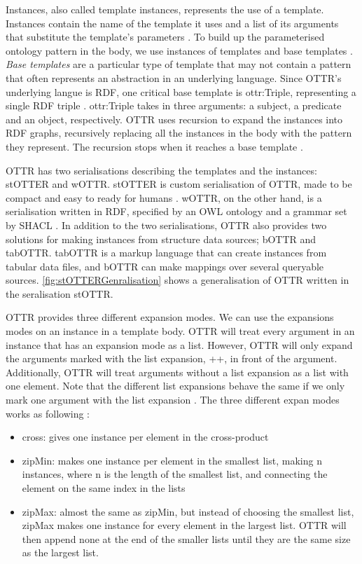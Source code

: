 \para
Instances, also called template instances, represents the use of a template.  Instances contain the name of the template it uses and a list of its arguments that substitute the template's parameters \autocite[3]{SLKK_OTTR_2021}. To build up the parameterised ontology pattern in the body, we use instances of templates and base templates \autocite[479]{SLKF_OTTR_2018}. \emph{Base templates} are a particular type of template that may not contain a pattern that often represents an abstraction in an underlying language. Since OTTR's underlying langue is RDF, one critical base template is ottr:Triple, representing a single RDF triple \autocite[4]{SLKK_OTTR_2021}. ottr:Triple takes in three arguments: a subject, a predicate and an object, respectively. OTTR uses recursion to expand the instances into RDF graphs, recursively replacing all the instances in the body with the pattern they represent. The recursion stops when it reaches a base template \autocite[479]{SLKF_OTTR_2018}.

\para
OTTR has two serialisations describing the templates and the instances: stOTTER and wOTTR. stOTTER is custom serialisation of OTTR, made to be compact and easy to ready for humans \autocite[4]{SLKK_OTTR_2021}. wOTTR, on the other hand, is a serialisation written in RDF, specified by an OWL ontology and a grammar set by SHACL \autocite{SHACL} \autocite[4]{SLKK_OTTR_2021}. In addition to the two serialisations, OTTR also provides two solutions for making instances from structure data sources; bOTTR and tabOTTR. tabOTTR is a markup language that can create instances from tabular data files, and bOTTR can make mappings over several queryable sources\autocite[16]{SLKK_OTTR_2021}. \autoref{fig:stOTTERGenralisation} shows a generalisation of OTTR written in the seralisation stOTTR.

\para
OTTR provides three different expansion modes. We can use the expansions modes on an instance in a template body. OTTR will treat every argument in an instance that has an expansion mode as a list. However, OTTR will only expand the arguments marked with the list expansion, ++, in front of the argument. Additionally, OTTR will treat arguments without a list expansion as a list with one element. Note that the different list expansions behave the same if we only mark one argument with the list expansion \autocite[480]{SLKF_OTTR_2018}. The three different expan modes works as following \autocite[8]{SLKK_OTTR_2021}:
\begin{itemize}
    \item cross: gives one instance per element in the cross-product
    \item zipMin: makes one instance per element in the smallest list, making n instances, where n is the length of the smallest list, and connecting the element on the same index in the lists
    \item zipMax: almost the same as zipMin, but instead of choosing the smallest list, zipMax makes one instance for every element in the largest list. OTTR will then append none at the end of the smaller lists until they are the same size as the largest list. 
\end{itemize}

